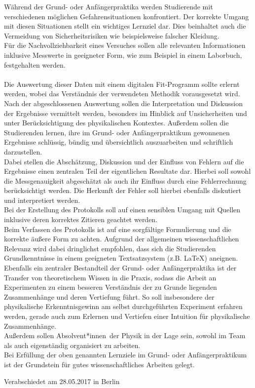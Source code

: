 \documentclass[DIV=calc]{scrartcl}
\newcommand{\gen}{*innen}
\begin{document}
Während der Grund- oder Anfängerpraktika werden Studierende mit verschiedenen möglichen Gefahrensituationen konfrontiert. Der korrekte Umgang mit diesen Situationen stellt ein wichtiges Lernziel dar.
Dies beinhaltet auch die Vermeidung von Sicherheitsrisiken wie beispielsweise falscher Kleidung.\\

Für die Nachvollziehbarkeit eines Versuches sollen alle relevanten Informationen inklusive Messwerte in geeigneter Form, wie zum Beispiel in einem Laborbuch, festgehalten werden.\\
\\
Die Auswertung dieser Daten mit einem digitalen Fit-Programm sollte erlernt werden, wobei das Verständnis der verwendeten Methodik vorausgesetzt wird.\\
Nach der abgeschlossenen Auswertung sollen die Interpretation und Diskussion der Ergebnisse vermittelt werden, besonders im Hinblick auf Unsicherheiten und unter Berücksichtigung des physikalischen Kontextes. Außerdem sollen die Studierenden lernen, ihre im Grund- oder Anfängerpraktikum gewonnenen Ergebnisse schlüssig, bündig und übersichtlich auszuarbeiten und schriftlich darzustellen.\\
Dabei stellen die Abschätzung, Diskussion und der Einfluss von Fehlern auf die Ergebnisse einen zentralen Teil der eigentlichen Resultate dar. Hierbei soll sowohl die Messgenauigkeit abgeschätzt als auch ihr Einfluss durch eine Fehlerrechnung berücksichtigt werden. Die Herkunft der Fehler soll hierbei ebenfalls diskutiert und interpretiert werden.\\

Bei der Erstellung des Protokolls soll auf einen sensiblen Umgang mit Quellen inklusive deren korrektes Zitieren geachtet werden.\\
Beim Verfassen des Protokolls ist auf eine sorgfältige Formulierung und die korrekte äußere Form zu achten. Aufgrund der allgemeinen wissenschaftlichen Relevanz wird dabei dringlichst empfohlen, dass sich die Studierenden Grundkenntnisse in einem geeigneten Textsatzsystem (z.B. LaTeX) aneignen.\\

Ebenfalls ein zentraler Bestandteil der Grund- oder Anfängerpraktika ist der Transfer von theoretischem Wissen in die Praxis, sodass die Arbeit an Experimenten zu einem besseren Verständnis der zu Grunde liegenden Zusammenhänge und deren Vertiefung führt. So soll insbesondere der physikalische Erkenntnisgewinn am selbst durchgeführten Experiment erfahren werden, gerade auch zum Erlernen und Vertiefen einer Intuition für physikalische Zusammenhänge.\\
Außerdem sollen Absolvent\gen \ der Physik in der Lage sein, sowohl im Team als auch eigenständig organisiert zu arbeiten.\\

Bei Erfüllung der oben genannten Lernziele im Grund- oder Anfängerpraktikum ist der Grundstein für gutes wissenschaftliches Arbeiten gelegt.
    \vfill
    \begin{flushright}
        Verabschiedet am 28.05.2017 in Berlin
    \end{flushright}
    
\end{document}
